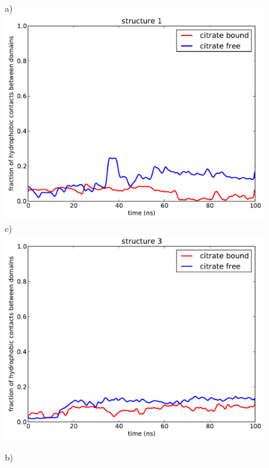 \documentclass[english, a4paper, 12pt, titlepage, draft]{article}
\begin{document}
\begin{figure}
    \begin{minipage}[]{0.45\linewidth}
        \centering
        a)
        \includegraphics[width=\textwidth]{figures/Complex_hydrophobic_core/hydrophobic_cont_structure1.pdf}  
        c)
        \includegraphics[width=\textwidth]{figures/Complex_hydrophobic_core/hydrophobic_cont_structure3.pdf}  
    \end{minipage}
\hspace{0.5cm}
    \begin{minipage}[]{0.45\linewidth}
        \centering
        b)

\end{minipage}
\end{figure}
\end{document}
